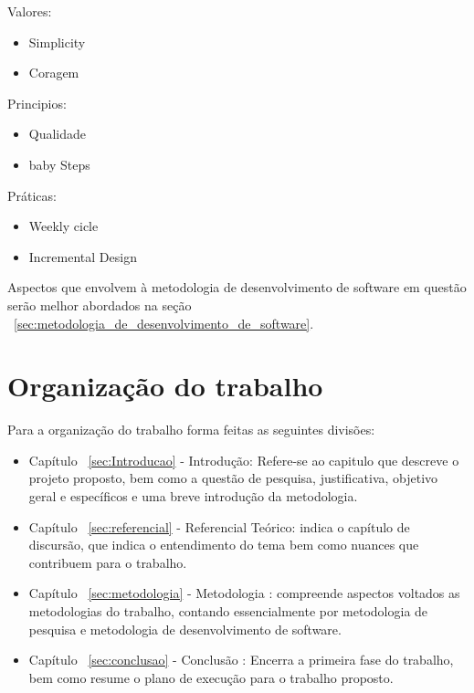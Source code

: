 Valores:

\begin{itemize}
   \item Simplicity
   \item Coragem
\end{itemize}

Principios:

\begin{itemize}
   \item Qualidade
   \item baby Steps
\end{itemize}

Práticas:

\begin{itemize}
   \item Weekly cicle
   \item Incremental Design
\end{itemize}

Aspectos que envolvem à metodologia de desenvolvimento de software em questão
serão melhor abordados na seção
~\ref{sec:metodologia_de_desenvolvimento_de_software}.

\section{Organização do trabalho}

Para a organização do trabalho forma feitas as seguintes divisões:

\begin{itemize}
   \item Capítulo ~\ref{sec:Introducao} - Introdução: Refere-se ao capitulo que descreve
         o projeto proposto, bem como a questão de pesquisa, justificativa, objetivo
         geral e específicos e uma breve introdução da metodologia.
   \item Capítulo ~\ref{sec:referencial} - Referencial Teórico: indica o capítulo de
         discursão, que indica o entendimento do tema bem como nuances que contribuem
         para o trabalho.
   \item Capítulo ~\ref{sec:metodologia} - Metodologia : compreende aspectos voltados as
         metodologias do trabalho, contando essencialmente por metodologia de pesquisa e
         metodologia de desenvolvimento de software.
   \item Capítulo ~\ref{sec:conclusao} - Conclusão : Encerra a primeira fase do
         trabalho, bem como resume o plano de execução para o trabalho proposto.
\end{itemize}